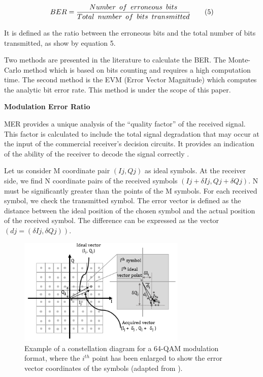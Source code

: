 \documentclass[10pt, conference]{IEEEtran}
\begin{document}
{\begin{adjustwidth}{1cm}{0cm}
{\scriptsize 

\[
  BER = \frac{Number\hspace{0.5em}of\hspace{0.5em}erroneous\hspace{0.5em}bits}{Total\hspace{0.5em}number\hspace{0.5em}of\hspace{0.5em}bits\hspace{0.5em}transmitted}
  \hspace{2em} (5)
\]}
\end{adjustwidth}
It is defined as the ratio between the erroneous bits and the total number of bits transmitted, as show by equation
5.

\noindent Two methods are presented in the literature to calculate
the BER. The Monte-Carlo method which is based on
bits counting and requires a high computation time. The
second method is the EVM (Error Vector Magnitude)
which computes the analytic bit error rate. This method
is under the scope of this paper.

\begin{adjustwidth}{-0.5cm}{0cm}
   \textbullet \textbf{  Modulation Error Ratio}
\end{adjustwidth}
MER provides a unique analysis of the “quality factor”
of the received signal. This factor is calculated to include
the total signal degradation that may occur at the input
of the commercial receiver’s decision circuits. It provides
an indication of the ability of the receiver to decode the
signal correctly \cite{15}.

\noindent Let us consider M coordinate pair $(Ij, Qj)$ as ideal symbols. At the receiver side, we find N coordinate pairs
of the received symbols $(Ij + \delta Ij, Qj + \delta Qj)$. N must be
significantly  greater than the points
 of the M symbols. For
each received symbol, we check the transmitted symbol.
The error vector is defined as the distance between the ideal position of the chosen symbol and the actual
position of the received symbol. The difference can be
expressed as the vector $(dj = (\delta Ij, \delta Qj))$.

\begin{figure}[!htbp]
\centering
\includegraphics[width=8cm]{images/graph.png}
\begin{adjustwidth}{-0.13cm}{0cm}
\caption{\footnotesize Example of a constellation diagram for a 64-QAM modulation format, where the $i^{th}$ point has been enlarged to show the error vector coordinates of the symbols (adapted from \cite{20}).}
\end{adjustwidth}
\end{figure}

}
\end{document}
